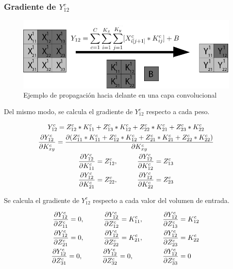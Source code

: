 \subsubsection{Gradiente de $Y^c_{12}$}

\begin{figure}[H]
	\centering
	\includegraphics[width=1\linewidth]{imagenes/conv_ejemplo_backprop_2.jpg} 
	\caption{Ejemplo de propagación hacia delante en una capa convolucional}
	\label{fig:ejemplo_2_forward_prop_convolucional}
\end{figure}

Del mismo modo, se calcula el gradiente de $Y^c_{12}$ respecto a cada peso.

\begin{gather}
	Y^c_{12} = Z^c_{12} * K^c_{11} + Z^c_{13} * K^c_{12} + Z^c_{22} * K^c_{21} + Z^c_{23} * K^c_{22} \\
	\frac{\partial Y^c_{12}}{\partial K^c_{xy}} = \frac{\partial (Z^c_{11} * K^c_{11} + Z^c_{12} * K^c_{12} + Z^c_{21} * K^c_{21} + Z^c_{22} * K^c_{22})}{\partial K^c_{xy}} \\
	\frac{\partial Y^c_{12}}{\partial K^c_{11}} = Z^c_{12}, \hspace{10mm} \frac{\partial Y^c_{12}}{\partial K^c_{12}} = Z^c_{13}\\
	\frac{\partial Y^c_{12}}{\partial K^c_{21}} = Z^c_{22}, \hspace{10mm} \frac{\partial Y^c_{12}}{\partial K^c_{22}} = Z^c_{23}
\end{gather}

Se calcula el gradiente de $Y^c_{12}$ respecto a cada valor del volumen de entrada.

\begin{gather}
	\frac{\partial Y^c_{12}}{\partial Z^c_{11}} = 0, \hspace{10mm} \frac{\partial Y^c_{12}}{\partial Z^c_{12}} = K^c_{11}, \hspace{10mm} \frac{\partial Y^c_{12}}{\partial Z^c_{13}} = K^c_{12}\\
	\frac{\partial Y^c_{12}}{\partial Z^c_{21}} = 0, \hspace{10mm} \frac{\partial Y^c_{12}}{\partial Z^c_{22}} = K^c_{21}, \hspace{10mm} \frac{\partial Y^c_{12}}{\partial Z^c_{23}} = K^c_{22}\\
	\frac{\partial Y^c_{12}}{\partial Z^c_{31}} = 0, \hspace{10mm} \frac{\partial Y^c_{12}}{\partial Z^c_{32}} = 0, \hspace{15mm} \frac{\partial Y^c_{12}}{\partial Z^c_{33}} = 0 \hspace{5mm}
\end{gather}

